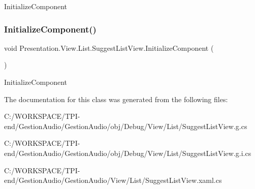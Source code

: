 Initialize\+Component 

\mbox{\label{class_presentation_1_1_view_1_1_list_1_1_suggest_list_view_a0d6458960ea2444bee0d02317d0f2baa}} 
\subsubsection{\texorpdfstring{Initialize\+Component()}{InitializeComponent()}\hspace{0.1cm}{\footnotesize\ttfamily [4/4]}}
{\footnotesize\ttfamily void Presentation.\+View.\+List.\+Suggest\+List\+View.\+Initialize\+Component (\begin{DoxyParamCaption}{ }\end{DoxyParamCaption})}



Initialize\+Component 



The documentation for this class was generated from the following files\+:\begin{DoxyCompactItemize}
\item 
C\+:/\+W\+O\+R\+K\+S\+P\+A\+C\+E/\+T\+P\+I-\/end/\+Gestion\+Audio/\+Gestion\+Audio/obj/\+Debug/\+View/\+List/Suggest\+List\+View.\+g.\+cs\item 
C\+:/\+W\+O\+R\+K\+S\+P\+A\+C\+E/\+T\+P\+I-\/end/\+Gestion\+Audio/\+Gestion\+Audio/obj/\+Debug/\+View/\+List/Suggest\+List\+View.\+g.\+i.\+cs\item 
C\+:/\+W\+O\+R\+K\+S\+P\+A\+C\+E/\+T\+P\+I-\/end/\+Gestion\+Audio/\+Gestion\+Audio/\+View/\+List/Suggest\+List\+View.\+xaml.\+cs\end{DoxyCompactItemize}
